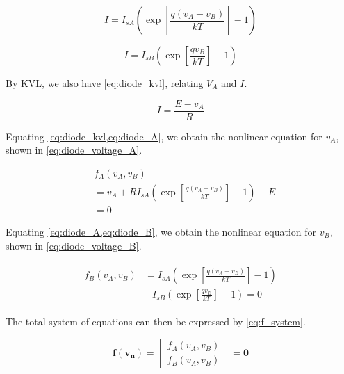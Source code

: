 \documentclass[a4paper,titlepage]{article}
\begin{document}
	\begin{equation} \label{eq:diode_A}
		I = I_{sA} \left( \exp\left[{\frac{q(v_A - v_B)}{kT}}\right] - 1\right)
	\end{equation}
	
	\begin{equation} \label{eq:diode_B}
		I = I_{sB} \left( \exp\left[{\frac{qv_B}{kT}}\right] - 1\right)
	\end{equation}
	
	By KVL, we also have \cref{eq:diode_kvl}, relating $V_A$ and $I$.
	
	\begin{equation} \label{eq:diode_kvl}
		I = \frac{E - v_A}{R}
	\end{equation}
	
	Equating \cref{eq:diode_kvl,eq:diode_A}, we obtain the nonlinear equation for $v_A$, shown in \cref{eq:diode_voltage_A}.
	
	\begin{equation} \label{eq:diode_voltage_A}
	\begin{split}
		&f_A(v_A, v_B) \\
		& = v_A + R I_{sA} \left( \exp\left[{\frac{q(v_A - v_B)}{kT}}\right] - 1\right) - E \\
		& = 0
	\end{split}
	\end{equation}
	
	Equating \cref{eq:diode_A,eq:diode_B}, we obtain the nonlinear equation for $v_B$, shown in \cref{eq:diode_voltage_B}.
	
	\begin{align} \label{eq:diode_voltage_B}
	\begin{split}
		f_B(v_A, v_B) &= I_{sA} \left( \exp\left[{\frac{q(v_A - v_B)}{kT}}\right] - 1\right)\\
		&- I_{sB} \left( \exp\left[{\frac{qv_B}{kT}}\right] - 1\right) = 0
	\end{split}
	\end{align}
	
	The total system of equations can then be expressed by \cref{eq:f_system}.
	
	\begin{equation} \label{eq:f_system}
		\mathbf{f}(\mathbf{v_n}) = 
		\begin{bmatrix}
		f_A(v_A, v_B) \\
		f_B(v_A, v_B)
		\end{bmatrix}
		= \mathbf{0}
	\end{equation}
	
\end{document}
